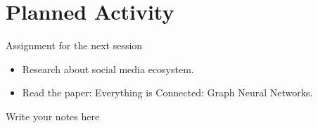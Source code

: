 \documentclass{beamer}
\begin{document}
\section{Planned Activity}
    \begin{frame}{Assignment for the next session}
        \begin{itemize}
            \item Research about social media ecosystem.
            \item Read the paper: Everything is Connected: Graph Neural Networks.
        \end{itemize}
        
        \begin{note}
            {Write your notes here}
        \end{note}
    \end{frame}
\end{document}
